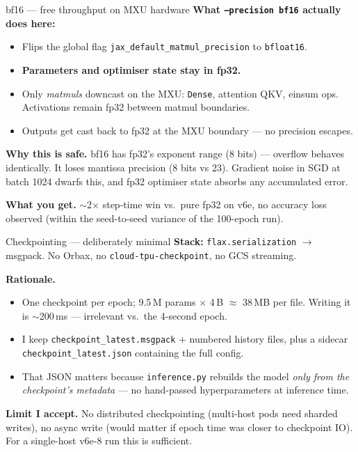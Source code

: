\documentclass[aspectratio=169,10pt]{beamer}
\begin{document}
\begin{frame}\label{slide:bf16}{bf16 — free throughput on MXU hardware}
  \textbf{What \texttt{--precision bf16} actually does here:}
  \begin{itemize}
    \item Flips the global flag \texttt{jax\_default\_matmul\_precision} to \texttt{bfloat16}.
    \item \textbf{Parameters and optimiser state stay in fp32.}
    \item Only \emph{matmuls} downcast on the MXU: \texttt{Dense}, attention QKV, einsum ops.
          Activations remain fp32 between matmul boundaries.
    \item Outputs get cast back to fp32 at the MXU boundary — no precision escapes.
  \end{itemize}

  \vspace{0.4em}
  \textbf{Why this is safe.} bf16 has fp32's exponent range (8 bits) — overflow behaves
  identically. It loses mantissa precision (8 bits vs 23). Gradient noise in SGD at
  batch 1024 dwarfs this, and fp32 optimiser state absorbs any accumulated error.

  \vspace{0.4em}
  \textbf{What you get.} $\sim$2$\times$ step-time win vs.\ pure fp32 on v6e, no accuracy loss
  observed (within the seed-to-seed variance of the 100-epoch run).
\end{frame}

\begin{frame}{Checkpointing — deliberately minimal}
  \textbf{Stack:} \texttt{flax.serialization} $\to$ msgpack. No Orbax, no
  \texttt{cloud-tpu-checkpoint}, no GCS streaming.

  \vspace{0.4em}
  \textbf{Rationale.}
  \begin{itemize}
    \item One checkpoint per epoch; 9.5\,M params $\times$ 4\,B $\approx$ 38\,MB per file.
          Writing it is $\sim$200\,ms — irrelevant vs.\ the 4-second epoch.
    \item I keep \texttt{checkpoint\_latest.msgpack} + numbered history files, plus a
          sidecar \texttt{checkpoint\_latest.json} containing the full config.
    \item That JSON matters because \texttt{inference.py} rebuilds the model
          \emph{only from the checkpoint's metadata} — no hand-passed hyperparameters
          at inference time.
  \end{itemize}

  \vspace{0.4em}
  \textbf{Limit I accept.} No distributed checkpointing (multi-host pods need sharded
  writes), no async write (would matter if epoch time was closer to checkpoint IO).
  For a single-host v6e-8 run this is sufficient.
\end{frame}
\end{document}
